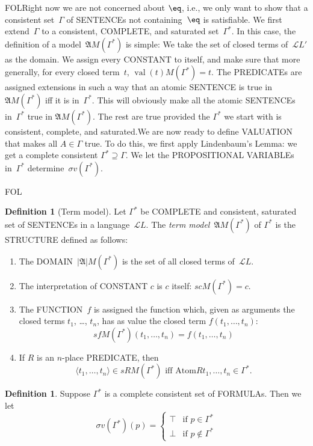 \documentclass[10pt,a4paper]{article}
\newcommand*{\olup}[1]{\MakeUppercase{#1}}
\theoremstyle{plain}
\theoremstyle{definition}
\newtheorem{defn}[thm]{Definition}
\theoremstyle{remark}
\newenvironment{explain}{}{}
\newcommand*{\ollabel}[1]{\label{#1}}
\providecommand{\True}{\top}
\providecommand{\False}{\bot}
\providecommand{\Struct}{\ensuremath{\mathfrak{A}}}
\providecommand{\Domain}{\ensuremath{|\mathfrak{A}|}}
\providecommand{\Assign}{\ensuremath{s}}
\providecommand{\Lang}{\ensuremath{\mathcal{L}}}
\providecommand{\tuple}[1]{\langle #1 \rangle}
\providecommand{\iftag}[1]{#1}
\providecommand{\Value}[1]{\operatorname{val}(#1)}
\providecommand{\pAssign}{\sigma}
\providecommand{\Atom}{\mathrm{Atom}}
\providecommand{\iftag}{}
\begin{document}
\begin{explain}
\iftag{FOL}{Right now we are not concerned about $\eq$, i.e., we only
  want to show that a consistent set~$\Gamma$ of \olup{sentence}s not
  containing~$\eq$ is satisfiable. We first extend~$\Gamma$ to a
  consistent, \olup{complete}, and saturated set~$\Gamma^*$.  In this
  case, the definition of a model~$\Struct{M(\Gamma^*)}$ is simple: We
  take the set of closed terms of~$\Lang{L'}$ as the domain. We assign
  every \olup{constant} to itself, and make sure that more generally, for
  every closed term~$t$, $\Value{t}{M(\Gamma^*)} = t$.  The
  \olup{predicate}s are assigned extensions in such a way that an atomic
  \olup{sentence} is true in $\Struct{M(\Gamma^*)}$ iff it is
  in~$\Gamma^*$.  This will obviously make all the atomic
  \olup{sentence}s in~$\Gamma^*$ true in $\Struct{M(\Gamma^*)}$. The rest
  are true provided the $\Gamma^*$ we start with is consistent,
  complete, and saturated.}{We are now ready to define \olup{valuation}
  that makes all $A \in \Gamma$ true. To do this, we first apply
  Lindenbaum's Lemma: we get a complete consistent $\Gamma^* \supseteq
  \Gamma$. We let the \olup{propositional variable}s in~$\Gamma^*$
  determine~$\pAssign v(\Gamma^*)$.}
\end{explain}

\iftag{FOL}{%
\begin{defn}[Term model]
\ollabel{defn:termmodel}
Let $\Gamma^*$ be \olup{complete} and consistent,
saturated set of \olup{sentence}s in a language~$\Lang L$. The \emph{term
  model}~$\Struct M(\Gamma^*)$ of $\Gamma^*$ is the \olup{structure}
defined as follows:
\begin{enumerate}
\item The \olup{domain}~$\Domain{M(\Gamma^*)}$ is the set of all closed
  terms of~$\Lang L$.
\item The interpretation of \olup{constant} $c$ is $c$ itself:
  $\Assign{c}{M(\Gamma^*)} = c$.
\item The \olup{function}~$f$ is assigned the function which, given as
  arguments the closed terms $t_1$, \dots, $t_n$, has as value the
  closed term $f(t_1, \dots, t_n)$:
\[
\Assign{f}{M(\Gamma^*)}(t_1, \dots, t_n) = f(t_1,\dots, t_n)
\]
\item If $R$ is an $n$-place \olup{predicate}, then
  \[
  \tuple{t_1, \dots,
  t_n} \in \Assign{R}{M(\Gamma^*)} \text{ iff } \Atom{R}{t_1, \dots,
    t_n} \in \Gamma^*.
  \]
\end{enumerate}
\end{defn}
}{%
\begin{defn}
\ollabel{defn:termmodel}
Suppose $\Gamma^*$ is a complete consistent set of \olup{formula}s. Then we let
\[
\pAssign v(\Gamma^*)(p) = \begin{cases}
  \True & \text{if $p \in \Gamma^*$}\\
  \False & \text{if $p \notin \Gamma^*$}
  \end{cases}
\]
\end{defn}
}
\end{document}
